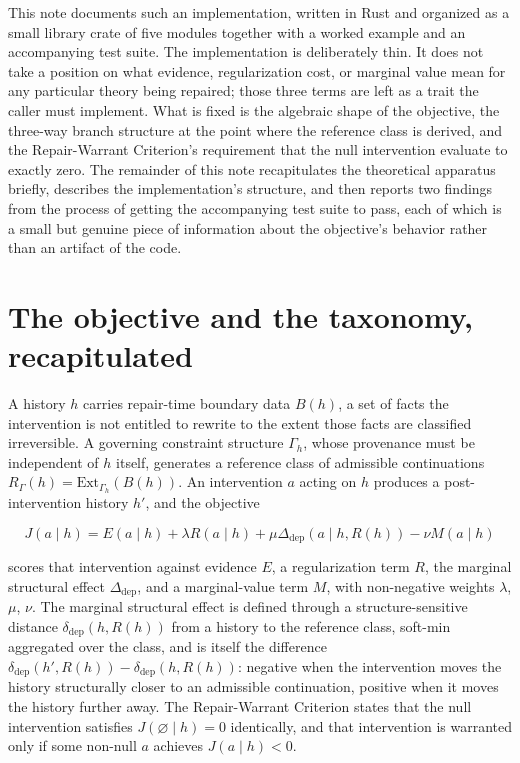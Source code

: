 \documentclass[11pt]{article}
\begin{document}
This note documents such an implementation, written in Rust and organized as a small library crate of five modules together with a worked example and an accompanying test suite. The implementation is deliberately thin. It does not take a position on what evidence, regularization cost, or marginal value mean for any particular theory being repaired; those three terms are left as a trait the caller must implement. What is fixed is the algebraic shape of the objective, the three-way branch structure at the point where the reference class is derived, and the Repair-Warrant Criterion's requirement that the null intervention evaluate to exactly zero. The remainder of this note recapitulates the theoretical apparatus briefly, describes the implementation's structure, and then reports two findings from the process of getting the accompanying test suite to pass, each of which is a small but genuine piece of information about the objective's behavior rather than an artifact of the code.

\section{The objective and the taxonomy, recapitulated}

A history $h$ carries repair-time boundary data $B(h)$, a set of facts the intervention is not entitled to rewrite to the extent those facts are classified irreversible. A governing constraint structure $\Gamma_h$, whose provenance must be independent of $h$ itself, generates a reference class of admissible continuations $R_\Gamma(h) = \mathrm{Ext}_{\Gamma_h}(B(h))$. An intervention $a$ acting on $h$ produces a post-intervention history $h'$, and the objective

\[
J(a \mid h) = E(a\mid h) + \lambda R(a\mid h) + \mu \Delta_{\text{dep}}(a \mid h, R(h)) - \nu M(a \mid h)
\]

scores that intervention against evidence $E$, a regularization term $R$, the marginal structural effect $\Delta_{\text{dep}}$, and a marginal-value term $M$, with non-negative weights $\lambda$, $\mu$, $\nu$. The marginal structural effect is defined through a structure-sensitive distance $\delta_{\text{dep}}(h, R(h))$ from a history to the reference class, soft-min aggregated over the class, and is itself the difference $\delta_{\text{dep}}(h', R(h)) - \delta_{\text{dep}}(h, R(h))$: negative when the intervention moves the history structurally closer to an admissible continuation, positive when it moves the history further away. The Repair-Warrant Criterion states that the null intervention satisfies $J(\varnothing \mid h) = 0$ identically, and that intervention is warranted only if some non-null $a$ achieves $J(a \mid h) < 0$.
\end{document}
